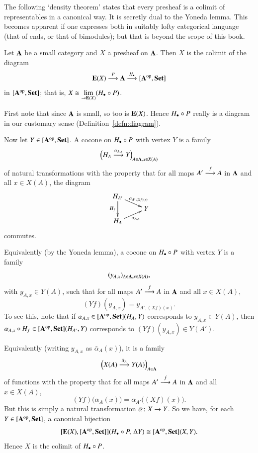 The following `density theorem' states that every presheaf is a colimit of
representables in a canonical way.  It is secretly dual to the Yoneda
lemma.  This becomes apparent if one expresses both in suitably lofty
categorical language (that of ends, or that of bimodules); but that is
beyond the scope of this book.

\begin{thm}[Density]
\label{thm:density}
%
%
Let $\mathbf{A}$ be a small category and $X$ a presheaf on $\mathbf{A}$.  Then $X$
is the colimit of the diagram
\[
\mathbf{E}(X) \stackrel{P}{\longrightarrow} \mathbf{A} \stackrel{H_\bullet}{\longrightarrow} [\mathbf{A}^{\mathrm{op}},\mathbf{Set}]
\]
in $[\mathbf{A}^{\mathrm{op}},\mathbf{Set}]$; that is, $X \cong \lim\limits_{\rightarrow \mathbf{E}(X)} (H_\bullet \mathbin{\circ} P)$.
\end{thm}

\begin{pf}
First note that since $\mathbf{A}$ is small, so too is $\mathbf{E}(X)$.  Hence $H_\bullet
\mathbin{\circ} P$ really is a diagram in our customary sense
(Definition~\ref{defn:diagram}).

Now let $Y \in [\mathbf{A}^{\mathrm{op}},\mathbf{Set}]$.  A cocone on $H_\bullet \mathbin{\circ} P$ with vertex $Y$ is
a family
\[
\Bigl(H_A \stackrel{\alpha_{A, x}}{\longrightarrow} Y\Bigr)_{A \in \mathbf{A}, x \in X(A)}
\]
of natural transformations with the property that for all maps $A'
\stackrel{f}{\longrightarrow} A$ in $\mathbf{A}$ and all $x \in X(A)$, the diagram
\[
\xymatrix@R=1ex{
\h_{A'} \ar[rd]^-{\alpha_{A', (Xf)(x)}} \ar[dd]_{\h_f}   &       \\
                                                        &Y      \\
\h_A \ar[ru]_-{\alpha_{A, x}}
}
\]
commutes.

Equivalently (by the Yoneda lemma), a cocone on $H_\bullet \mathbin{\circ} P$ with vertex $Y$
is a family
\[
(y_{A, x})_{A \in \mathbf{A}, x \in X(A)},
\]
with $y_{A, x} \in Y(A)$, such that for all maps $A' \stackrel{f}{\longrightarrow} A$ in
$\mathbf{A}$ and all $x \in X(A)$,
\[
(Yf)(y_{A, x}) = y_{A', (Xf)(x)}.
\]
To see this, note that if $\alpha_{A, x} \in [\mathbf{A}^{\mathrm{op}},\mathbf{Set}](H_A, Y)$
corresponds to $y_{A, x} \in Y(A)$, then $\alpha_{A, x} \mathbin{\circ} H_f \in
[\mathbf{A}^{\mathrm{op}},\mathbf{Set}](H_{A'}, Y)$ corresponds to $(Yf)(y_{A, x}) \in Y(A')$.

Equivalently (writing $y_{A, x}$ as $\bar{\alpha}_A(x)$), it is a family
\[
\Bigl(X(A) \stackrel{\bar{\alpha}_A}{\longrightarrow} Y(A)\Bigr)_{A \in \mathbf{A}}
\]
of functions with the property that for all maps $A' \stackrel{f}{\longrightarrow} A$
in $\mathbf{A}$ and all $x \in X(A)$,
\[
(Yf)\bigl(\bar{\alpha}_A(x)\bigr)
=
\bar{\alpha}_{A'}\bigl((Xf)(x)\bigr).
\]
But this is simply a natural transformation $\bar{\alpha}\from X \to Y$.
So we have, for each $Y \in [\mathbf{A}^{\mathrm{op}},\mathbf{Set}]$, a canonical bijection
\[
[\mathbf{E}(X),[\mathbf{A}^{\mathrm{op}},\mathbf{Set}]] (H_\bullet \mathbin{\circ} P, \, \Delta Y)
\cong
[\mathbf{A}^{\mathrm{op}},\mathbf{Set}] (X, Y).
\]
Hence $X$ is the colimit of $H_\bullet \mathbin{\circ} P$.
\end{pf}

